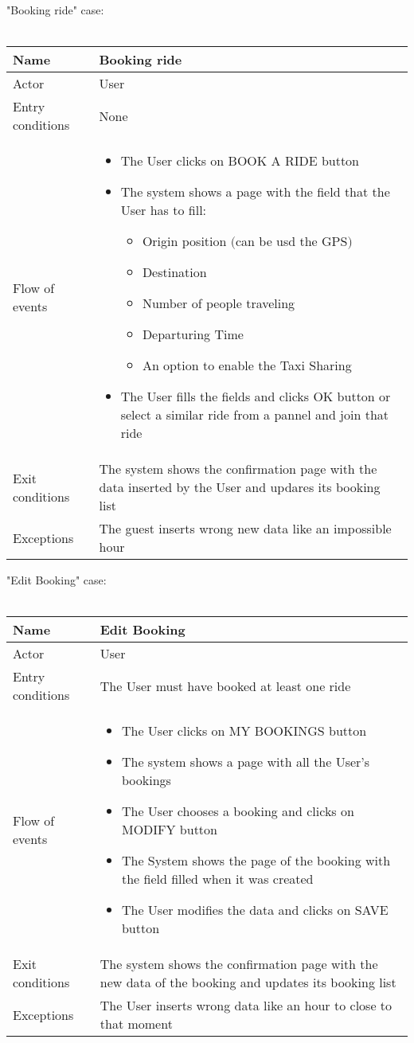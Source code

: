 \newpage
"Booking ride" case:
\\
\\
\begin{tabular}{|p{3cm}|p{10cm}|}
\hline
Name & Booking ride\\
\hline
Actor & User\\
\hline
Entry conditions & None\\
\hline
Flow of events &
	\begin{itemize}
		\item The User clicks on BOOK A RIDE button
		\item The system shows a page with the field that the User has to fill:
		\begin{itemize}
			\item Origin position $($can be usd the GPS$)$
			\item Destination
			\item Number of people traveling
			\item Departuring Time
			\item An option to enable the Taxi Sharing
		\end{itemize}
		\item The User fills the fields and clicks OK button or select a similar ride from a pannel and join that ride
	\end{itemize}\\
\hline
Exit conditions & The system shows the confirmation page with the data inserted by the User and updares its booking list\\
\hline
Exceptions & The guest inserts wrong new data like an impossible hour\\
\hline
\end {tabular}


\newpage
"Edit Booking" case:
\\
\\
\begin{tabular}{|p{3cm}|p{10cm}|}
\hline
Name & Edit Booking\\
\hline
Actor & User\\
\hline
Entry conditions & The User must have booked at least one ride\\
\hline
Flow of events &
	\begin{itemize}
			\item The User clicks on MY BOOKINGS button
			\item The system shows a page with all the User's bookings
			\item The User chooses a booking and clicks on MODIFY button
			\item The System shows the page of the booking with the field filled when it was created
			\item The User modifies the data and clicks on SAVE button
	\end{itemize}\\
\hline
Exit conditions & The system shows the confirmation page with the new data of the booking and updates its booking list\\
\hline
Exceptions & The User inserts wrong data like an hour to close to that moment\\
\hline
\end {tabular}

